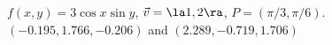 {$f(x,y) = 3\cos x\sin y$,  $\vec v = \la 1,2\ra$, $P=(\pi/3, \pi/6)$.
}
{
$(-0.195,1.766,-0.206)$ and $(2.289,-0.719, 1.706)$ 
}